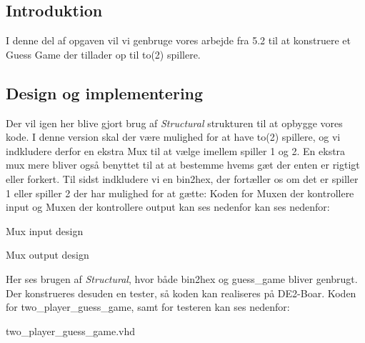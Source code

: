 \documentclass[../journal.tex]{subfiles}
\begin{document}
\subsection{Introduktion}
I denne del af opgaven vil vi genbruge vores arbejde fra 5.2 til at konstruere et Guess Game der tillader op til to(2) spillere. 



\subsection{Design og implementering}

Der vil igen her blive gjort brug af \textit{Structural} strukturen til at opbygge vores kode. I denne version skal der være mulighed for at have to(2) spillere, og vi indkludere derfor en ekstra Mux til at vælge imellem spiller 1 og 2. En ekstra mux mere bliver også benyttet til at at bestemme hvems gæt der enten er rigtigt eller forkert. Til sidst indkludere vi en bin2hex, der fortæller os om det er spiller 1 eller spiller 2 der har mulighed for at gætte: Koden for Muxen der kontrollere input og Muxen der kontrollere output kan ses nedenfor kan ses nedenfor:

\begin{table}[H]
    \centering
      \framebox{
        \rule{8pt}{0pt}
          
  }
  \caption{Mux input design}	
  \label{src:mux1}
\end{table}

\begin{table}[H]
    \centering
      \framebox{
        \rule{8pt}{0pt}
          
  }
  \caption{Mux output design}	
  \label{src:mux2}
\end{table}

Her ses brugen af \textit{Structural}, hvor både bin2hex og guess\_game bliver genbrugt. Der konstrueres desuden en tester, så koden kan realiseres på DE2-Boar. Koden for two\_player\_guess\_game, samt for testeren kan ses nedenfor:

\begin{table}[H]
    \centering
      \framebox{
        \rule{8pt}{0pt}
          
  }
  \caption{two\_player\_guess\_game.vhd}	
  \label{src:two_guess}
\end{table}
\end{document}
